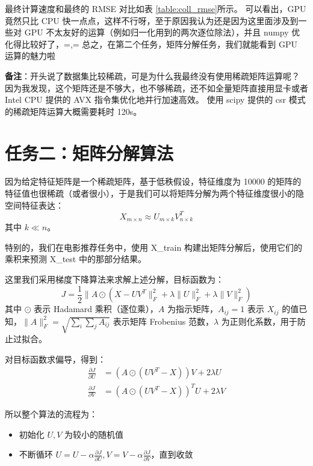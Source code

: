 \documentclass[degree=project,degree-type=project]{thuthesis}
\begin{document}
最终计算速度和最终的 RMSE 对比如表 \ref{table:coll_rmse}所示。
可以看出，GPU 竟然只比 CPU 快一点点，这样不行呀，至于原因我认为还是因为这里面涉及到一些对 GPU 不太友好的运算（例如归一化用到的两次逐位除法），并且 numpy 优化得比较好了，=,=
总之，在第二个任务，矩阵分解任务，我们就能看到 GPU 运算的魅力啦~

\textbf{备注}：开头说了数据集比较稀疏，可是为什么我最终没有使用稀疏矩阵运算呢？
因为我发现，这个矩阵还是不够大，也不够稀疏，还不如全量矩阵直接用显卡或者 Intel CPU 提供的 AVX 指令集优化地并行加速高效。
使用 scipy 提供的 csr 模式的稀疏矩阵运算大概需要耗时 120s。

\chapter{任务二：矩阵分解算法}

因为给定特征矩阵是一个稀疏矩阵，基于低秩假设，特征维度为 10000 的矩阵的特征值也很稀疏（或者很小），于是我们可以将矩阵分解为两个特征维度很小的隐空间特征表达：
\begin{equation}
X_{m \times n} \approx U_{m \times k} V_{n \times k}^T
\end{equation}
其中 $k \ll n$。

特别的，我们在电影推荐任务中，使用 X\_train 构建出矩阵分解后，使用它们的乘积来预测 X\_test 中的那部分结果。

这里我们采用梯度下降算法来求解上述分解，目标函数为：
\begin{equation}
J = \frac{1}{2} \lVert A \odot (X - UV^T \rVert_F^2 + \lambda \lVert U \rVert_F^2 + \lambda \lVert V \rVert_F^2)
\end{equation}
其中 $\odot$ 表示 Hadamard 乘积（逐位乘），$A$ 为指示矩阵，$A_{ij} = 1$ 表示 $X_{ij}$ 的值已知，$\lVert A \rVert_F^2 = \sqrt{\sum_i \sum_j A_{ij}}$ 表示矩阵 Frobenius 范数，$\lambda$ 为正则化系数，用于防止过拟合。

对目标函数求偏导，得到：
\begin{align}
  \frac{\partial J}{\partial U} &= (A \odot (UV^T - X))V + 2\lambda U\\
  \frac{\partial J}{\partial V} &= (A \odot (UV^T - X))^TU + 2\lambda V
\end{align}

所以整个算法的流程为：

\begin{itemize}
  \item 初始化 $U, V$ 为较小的随机值
  \item 不断循环 $U = U - \alpha \frac{\partial J}{\partial U}, V = V - \alpha \frac{\partial J}{\partial V}$，直到收敛
\end{itemize}
\end{document}

